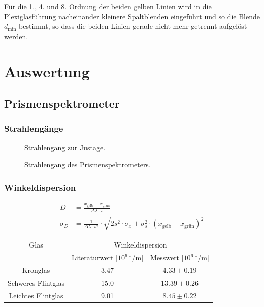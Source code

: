 \documentclass[12pt,a4paper,titlepage,headinclude,bibtotoc]{scrartcl}
\begin{document}
Für die 1., 4. und 8. Ordnung der beiden gelben Linien wird in die Plexiglasführung nacheinander kleinere Spaltblenden eingeführt und so die Blende $d_\text{min}$ bestimmt, so dass die beiden Linien gerade nicht mehr getrennt aufgelöst werden.

\section{Auswertung}
\label{sec:auswertung}

\subsection{Prismenspektrometer}
\subsubsection{Strahlengänge}
\begin{figure}[!htb]
	\def\svgwidth{0.8\linewidth}	
	
	\caption{Strahlengang zur Justage.}
\end{figure}


\begin{figure}[!htb]
	\def\svgwidth{0.8\linewidth}
	
	\caption{Strahlengang des Prismenspektrometers.}
\end{figure}

\subsubsection{Winkeldispersion}
\begin{align}
	D&=\frac{x_\text{gelb} - x_\text{grün}}{\Delta\lambda \cdot s}\\
\sigma_{D}&=\frac{1}{\Delta\lambda \cdot s^{2}} \cdot \sqrt{2s^{2} \cdot \sigma_{x} + \sigma_{s}^{2} \cdot \left(x_\text{gelb} - x_\text{grün}\right)^{2}}
\end{align}

\begin{table}[!htb]
	\centering
	\begin{tabular}{|c|c|c|}
		\hline
		Glas & \multicolumn{2}{c|}{Winkeldispersion}\\		
		 & Literaturwert [$10^6~^\circ$/m] & Messwert [$10^6~^\circ$/m]\\
		\hline
		Kronglas& 3.47 & $4.33 \pm 0.19$ \\
		Schweres Flintglas & 15.0 & $13.39 \pm 0.26$ \\
		Leichtes Flintglas & 9.01 & $8.45 \pm 0.22$ \\
		\hline
	\end{tabular}
	\label{tab:Dispersion}
\end{table}
\end{document}
